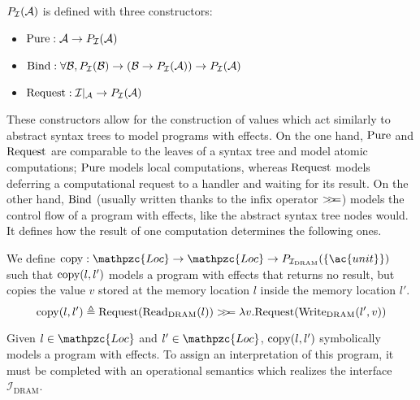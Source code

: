 \begin{definition}
  $P_{\mathcal{I}}(\mathcal{A})$ is defined with three constructors:
  \begin{itemize}
  \item $\mathrm{Pure} : \mathcal{A} \rightarrow P_{\mathcal{I}}(\mathcal{A})$
  \item
    $\mathrm{Bind} : \forall \mathcal{B}, P_{\mathcal{I}}(\mathcal{B}) \rightarrow
    (\mathcal{B} \rightarrow P_{\mathcal{I}}(\mathcal{A})) \rightarrow
    P_{\mathcal{I}}(\mathcal{A})$
  \item
    $\mathrm{Request} : \mathcal{I}|_{\mathcal{A}} \rightarrow
    P_{\mathcal{I}}(\mathcal{A})$
  \end{itemize}
\end{definition}
%
These constructors allow for the construction of values which act similarly to
abstract syntax trees to model programs with effects.
%
On the one hand, $\mathrm{Pure}$ and $\mathrm{Request}$ are comparable to the leaves
of a syntax tree and model atomic computations; $\mathrm{Pure}$ models local
computations, whereas $\mathrm{Request}$ models deferring a computational request
to a handler and waiting for its result.
%
On the other hand, $\mathrm{Bind}$ (usually written thanks to the infix operator
$>\!\!>\!\!=$) models the control flow of a program with effects, like the abstract
syntax tree nodes would.
%
It defines how the result of one computation determines the following ones.

\begin{example}[Copy]
  We define
  $\func{copy} : \mathpzc{Loc} \rightarrow \mathpzc{Loc} \rightarrow
  P_{\I_{\mathrm{DRAM}}}(\{\ac{unit}\})$ such that $\mathrm{copy}(l, l')$ models a
  program with effects that returns no result, but copies the value $v$ stored
  at the memory location $l$ inside the memory location $l'$.
  \[ \mathrm{copy}(l, l') \triangleq
    \mathrm{Request}(\mathrm{Read}_{\mathrm{DRAM}}(l)) >\!\!>\!\!= \lambda
    v. \mathrm{Request}(\mathrm{Write}_{\mathrm{DRAM}}(l', v))
  \]
\end{example}

Given $l \in \mathpzc{Loc}$ and $l' \in \mathpzc{Loc}$, $\mathrm{copy}(l, l')$
symbolically models a program with effects.
%
To assign an interpretation of this program, it must be completed with an
operational semantics which realizes the interface
$\mathcal{I}_{\mathrm{DRAM}}$.

